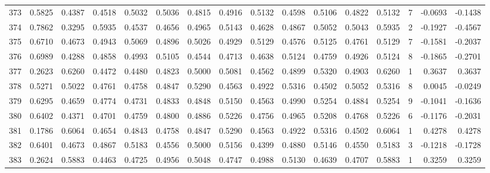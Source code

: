 \begin{tabular}{lrrrrrrrrrrrrrrr}
373 &      0.5825 &  0.4387 &  0.4518 &  0.5032 &  0.5036 &  0.4815 &  0.4916 &  0.5132 &  0.4598 &  0.5106 &   0.4822 &     0.5132 &      7 &                   -0.0693 &                    -0.1438 \\
374 &      0.7862 &  0.3295 &  0.5935 &  0.4537 &  0.4656 &  0.4965 &  0.5143 &  0.4628 &  0.4867 &  0.5052 &   0.5043 &     0.5935 &      2 &                   -0.1927 &                    -0.4567 \\
375 &      0.6710 &  0.4673 &  0.4943 &  0.5069 &  0.4896 &  0.5026 &  0.4929 &  0.5129 &  0.4576 &  0.5125 &   0.4761 &     0.5129 &      7 &                   -0.1581 &                    -0.2037 \\
376 &      0.6989 &  0.4288 &  0.4858 &  0.4993 &  0.5105 &  0.4544 &  0.4713 &  0.4638 &  0.5124 &  0.4759 &   0.4926 &     0.5124 &      8 &                   -0.1865 &                    -0.2701 \\
377 &      0.2623 &  0.6260 &  0.4472 &  0.4480 &  0.4823 &  0.5000 &  0.5081 &  0.4562 &  0.4899 &  0.5320 &   0.4903 &     0.6260 &      1 &                    0.3637 &                     0.3637 \\
378 &      0.5271 &  0.5022 &  0.4761 &  0.4758 &  0.4847 &  0.5290 &  0.4563 &  0.4922 &  0.5316 &  0.4502 &   0.5052 &     0.5316 &      8 &                    0.0045 &                    -0.0249 \\
379 &      0.6295 &  0.4659 &  0.4774 &  0.4731 &  0.4833 &  0.4848 &  0.5150 &  0.4563 &  0.4990 &  0.5254 &   0.4884 &     0.5254 &      9 &                   -0.1041 &                    -0.1636 \\
380 &      0.6402 &  0.4371 &  0.4701 &  0.4759 &  0.4800 &  0.4886 &  0.5226 &  0.4756 &  0.4965 &  0.5208 &   0.4768 &     0.5226 &      6 &                   -0.1176 &                    -0.2031 \\
381 &      0.1786 &  0.6064 &  0.4654 &  0.4843 &  0.4758 &  0.4847 &  0.5290 &  0.4563 &  0.4922 &  0.5316 &   0.4502 &     0.6064 &      1 &                    0.4278 &                     0.4278 \\
382 &      0.6401 &  0.4673 &  0.4867 &  0.5183 &  0.4556 &  0.5000 &  0.5156 &  0.4399 &  0.4880 &  0.5146 &   0.4550 &     0.5183 &      3 &                   -0.1218 &                    -0.1728 \\
383 &      0.2624 &  0.5883 &  0.4463 &  0.4725 &  0.4956 &  0.5048 &  0.4747 &  0.4988 &  0.5130 &  0.4639 &   0.4707 &     0.5883 &      1 &                    0.3259 &                     0.3259 \\

\end{tabular}
